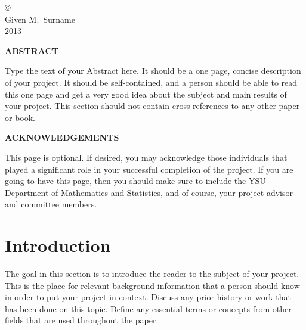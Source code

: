 \documentclass[11pt]{article}
\begin{document}
\newpage
\thispagestyle{empty}
\begin{center}
\vspace*{3in}
\copyright \\
\vspace{0.25in}
Given M.~Surname \\
\vspace{0.25in}
2013 \\
\end{center}

\vfill

\newpage
{}
\setcounter{page}{3}
\doublespacing
\begin{center}
\textbf{ABSTRACT} 
\end{center} \vspace{0.25in}

Type the text of your Abstract here.  It should be a one page, 
concise description of your project. It should be self-contained, 
and a person should be able to read this one page and get a very 
good idea about the subject and main results of your project. 
This section should not contain cross-references to any other 
paper or book. 

\newpage
\begin{center}
\textbf{ACKNOWLEDGEMENTS} 
\end{center} \vspace{0.25in}

This page is optional. If desired, you may acknowledge those 
individuals that played a significant role in your successful 
completion of the project. If you are going to have this page, 
then you should make sure to include the YSU Department of 
Mathematics and Statistics, and of course, your project advisor 
and committee members.

\newpage
\tableofcontents
\newpage

\section[Introduction]{Introduction}
\label{sec-1}

The goal in this section is to introduce the reader to the subject of
your project. This is the place for relevant background information
that a person should know in order to put your project in
context. Discuss any prior history or work that has been done on this
topic. Define any essential terms or concepts from other fields that
are used throughout the paper.
\end{document}

